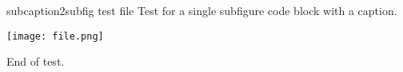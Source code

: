 subcaption2subfig test file
Test for a single subfigure code block with a caption.

\begin{subfigure}
    \caption{Fancy caption text.}
    \texttt{[image: file.png]}
\end{subfigure}

End of test.
